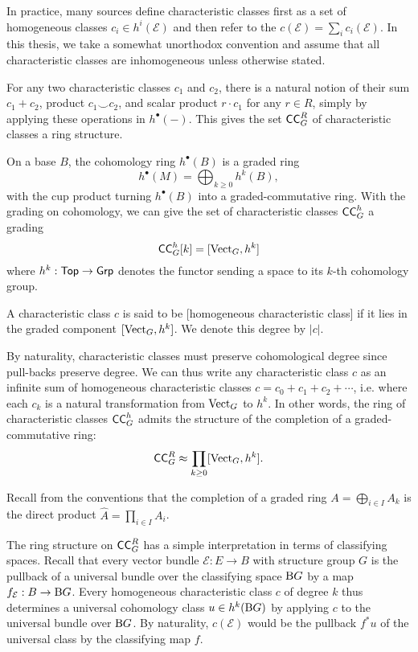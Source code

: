 \begin{remark}
	In practice, many sources define characteristic classes first as a set of homogeneous classes $c_i\in h^i(\mathcal{E})$ and then refer to the  $c(\mathcal{E})=\sum_i c_i(\mathcal{E})$. In this thesis, we take a somewhat unorthodox convention and assume that all characteristic classes are inhomogeneous unless otherwise stated.
\end{remark}

For any two characteristic classes $c_1$ and $c_2$, there is a natural notion of their sum $c_1+c_2$, product $c_1\smile c_2$, and scalar product $r\cdot c_1$ for any $r\in R$, simply by applying these operations in $h^\bullet(-)$. This gives the set $\mathsf{CC}_G^R$ of characteristic classes a ring structure.

On a base $B$, the cohomology ring $h^\bullet(B)$ is a graded ring
\[
	h^\bullet(M) = \bigoplus_{k\geq 0} h^k(B),
\]
with the cup product turning $h^\bullet(B)$ into a graded-commutative ring.
With the grading on cohomology, we can give the set of characteristic classes $\mathsf{CC}_G^h$ a grading
\[
	\mathsf{CC}_G^h[k] = [\operatorname{Vect}_G, h^k]
\]
where $h^k: \mathsf{Top} \to \mathsf{Grp}$ denotes the functor sending a space to its $k$-th cohomology group.

\begin{definition}
	A characteristic class $c$ is said to be [homogeneous characteristic class] if it lies in the graded component $[\operatorname{Vect}_G, h^k]$. We denote this degree by $|c|$.
\end{definition}

By naturality, characteristic classes must preserve cohomological degree since pull-backs preserve degree. We can thus write any characteristic class $c$ as an infinite sum of homogeneous characteristic classes $c=c_0+c_1+c_2+\cdots$, i.e. where each $c_k$ is a natural transformation from $\operatorname{Vect}_G$ to $h^k$.
In other words, the ring of characteristic classes $\mathsf{CC}_G^h$ admits the structure of the completion of a graded-commutative ring:
\[
	\mathsf{CC}_G^R \approx \prod_{k \geq 0} [\operatorname{Vect}_G, h^k].
\]
\begin{remark}
	Recall from the conventions that the completion of a graded ring $A=\bigoplus_{i\in I} A_k$ is the direct product $\widehat{A}=\prod_{i\in I} A_i$.
\end{remark}

The ring structure on $\mathsf{CC}_G^R$ has a simple interpretation in terms of classifying spaces. Recall that every vector bundle $\mathcal{E} : E \to B$ with structure group $G$ is the pullback of a universal bundle over the classifying space $\mathrm{B} G$ by a map $f_{\mathcal{E}} : B \to \mathrm{B} G$.
Every homogeneous characteristic class $c$ of degree $k$ thus determines a universal cohomology class $u\in h^k(\mathrm{B} G)$ by applying $c$ to the universal bundle over $\mathrm{B} G$. By naturality, $c(\mathcal{E})$ would be the pullback $f^*u$ of the universal class by the classifying map $f$.

